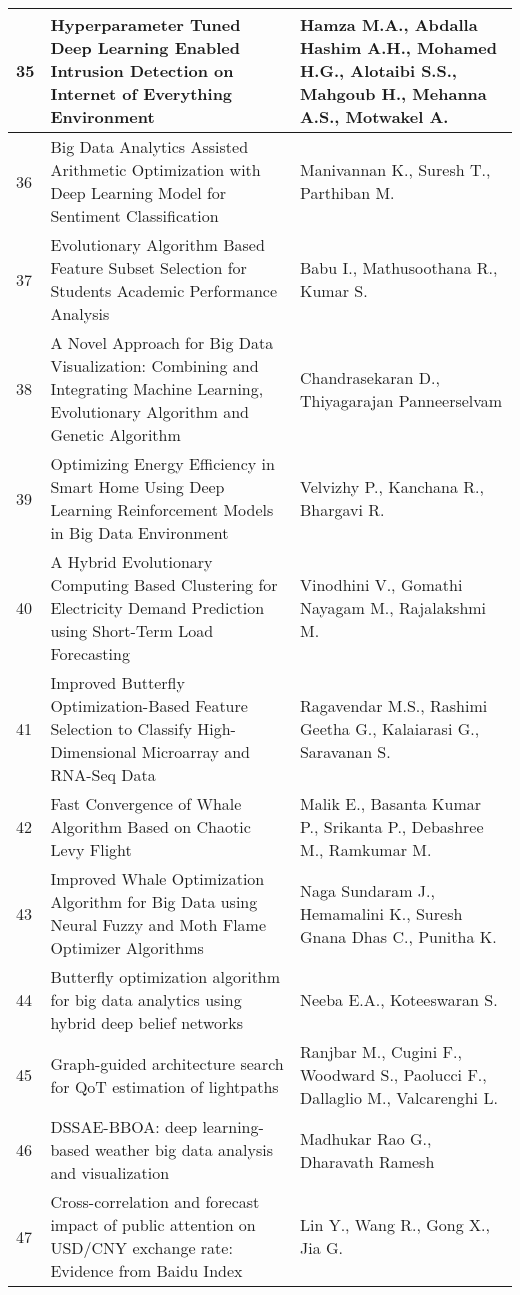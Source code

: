 \begin{longtable}{|p{}|p{}|p{}|}
\hline
35 & Hyperparameter Tuned Deep Learning Enabled Intrusion Detection on Internet of Everything Environment & Hamza M.A., Abdalla Hashim A.H., Mohamed H.G., Alotaibi S.S., Mahgoub H., Mehanna A.S., Motwakel A. \\
\hline
36 & Big Data Analytics Assisted Arithmetic Optimization with Deep Learning Model for Sentiment Classification & Manivannan K., Suresh T., Parthiban M. \\
\hline
37 & Evolutionary Algorithm Based Feature Subset Selection for Students Academic Performance Analysis & Babu I., Mathusoothana R., Kumar S. \\
\hline
38 & A Novel Approach for Big Data Visualization: Combining and Integrating Machine Learning, Evolutionary Algorithm and Genetic Algorithm & Chandrasekaran D., Thiyagarajan Panneerselvam \\
\hline
39 & Optimizing Energy Efficiency in Smart Home Using Deep Learning Reinforcement Models in Big Data Environment & Velvizhy P., Kanchana R., Bhargavi R. \\
\hline
40 & A Hybrid Evolutionary Computing Based Clustering for Electricity Demand Prediction using Short-Term Load Forecasting & Vinodhini V., Gomathi Nayagam M., Rajalakshmi M. \\
\hline
41 & Improved Butterfly Optimization-Based Feature Selection to Classify High-Dimensional Microarray and RNA-Seq Data & Ragavendar M.S., Rashimi Geetha G., Kalaiarasi G., Saravanan S. \\
\hline
42 & Fast Convergence of Whale Algorithm Based on Chaotic Levy Flight & Malik E., Basanta Kumar P., Srikanta P., Debashree M., Ramkumar M. \\
\hline
43 & Improved Whale Optimization Algorithm for Big Data using Neural Fuzzy and Moth Flame Optimizer Algorithms & Naga Sundaram J., Hemamalini K., Suresh Gnana Dhas C., Punitha K. \\
\hline
44 & Butterfly optimization algorithm for big data analytics using hybrid deep belief networks & Neeba E.A., Koteeswaran S. \\
\hline
45 & Graph-guided architecture search for QoT estimation of lightpaths & Ranjbar M., Cugini F., Woodward S., Paolucci F., Dallaglio M., Valcarenghi L. \\
\hline
46 & DSSAE-BBOA: deep learning-based weather big data analysis and visualization & Madhukar Rao G., Dharavath Ramesh \\
\hline
47 & Cross-correlation and forecast impact of public attention on USD/CNY exchange rate: Evidence from Baidu Index & Lin Y., Wang R., Gong X., Jia G. \\

\end{longtable}
